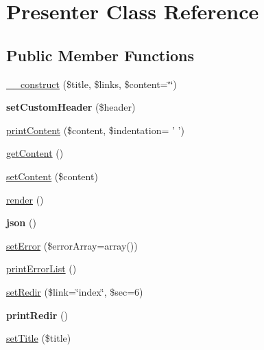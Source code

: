 \hypertarget{classPresenter}{\section{Presenter Class Reference}
\label{classPresenter}
}
\subsection*{Public Member Functions}
\begin{DoxyCompactItemize}
\item 
\hyperlink{classPresenter_a364fc50678030d816f515223be72b23a}{\+\_\+\+\_\+construct} (\$title, \$links, \$content=\char`\"{}\char`\"{})
\item 
\hypertarget{classPresenter_a299e31916fc252227e369fc5efad77f9}{{\bfseries set\+Custom\+Header} (\$header)}\label{classPresenter_a299e31916fc252227e369fc5efad77f9}

\item 
\hyperlink{classPresenter_a327ab1b725813be28114753935b42cd4}{print\+Content} (\$content, \$indentation= ' ')
\item 
\hyperlink{classPresenter_a8a9d11db6633e0ebb898abd4580f8988}{get\+Content} ()
\item 
\hyperlink{classPresenter_a9a7d0d294934548d13620baca0657087}{set\+Content} (\$content)
\item 
\hyperlink{classPresenter_a2194a46cf6c23dd4e483f1ee63bc2236}{render} ()
\item 
\hypertarget{classPresenter_a02088a50a3134097a1b785b0315937b6}{{\bfseries json} ()}\label{classPresenter_a02088a50a3134097a1b785b0315937b6}

\item 
\hyperlink{classPresenter_a1d66815ed950c7362a9c87bbcc6d9b7b}{set\+Error} (\$error\+Array=array())
\item 
\hyperlink{classPresenter_a5e4fe61038c5535719c6d7bc3b557019}{print\+Error\+List} ()
\item 
\hyperlink{classPresenter_a7dffb86806a017ebd3e13ca331c6f15a}{set\+Redir} (\$link=\char`\"{}index\char`\"{}, \$sec=6)
\item 
\hypertarget{classPresenter_ace2a8a72ee53e6be953614d00e29f741}{{\bfseries print\+Redir} ()}\label{classPresenter_ace2a8a72ee53e6be953614d00e29f741}

\item 
\hyperlink{classPresenter_a80cf6f790c8705d20632f7e3a73947fe}{set\+Title} (\$title)
\end{DoxyCompactItemize}


